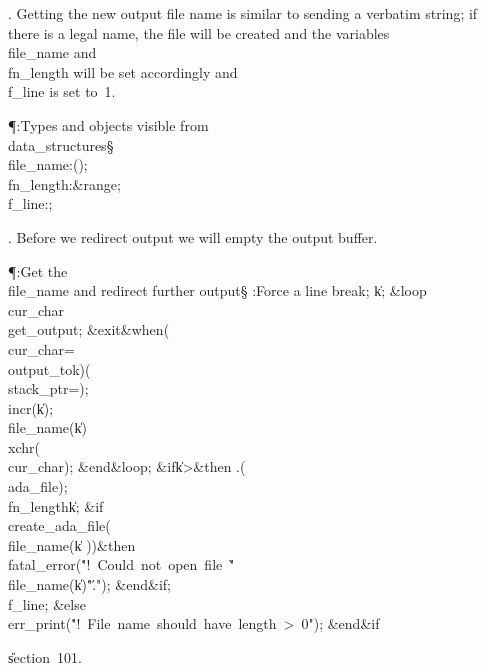 . Getting the new output file name is similar to sending a verbatim
string;
if there is a legal name, the file will be created and the variables
\\{file\_name} and \\{fn\_length} will be set accordingly and \\{f\_line} is
set
to~1.

\Y\P\?\4:Types and objects visible from \\{data\_structures}\X\mathrel{+}\S%
\?\6
\\{file\_name}\?:\?\?\1(\?\to{}\?\2)\?;\6
\\{fn\_length}\?:\?\8\&{range}\?\to{};\6
\\{f\_line}\?:\?;\par
\fi

. Before we redirect output we will empty the output buffer.

\Y\P\?\4:Get the \\{file\_name} and redirect further output\X\S\?\6
:Force a line break\X;\6
\|k\?\K{};\6
\1\&{loop}\6
\\{cur\_char}\?\K\?\\{get\_output};\5
\?\&{exit}\8\&{when}\8\1(\?\\{cur\_char}\?=\?\\{output\_tok}\?\2)\V\1(\?%
\\{stack\_ptr}\?=\?\2)\?;\6
\\{incr}\?\1(\?\|k\?\2)\?;\5
\\{file\_name}\?\1(\?\|k\?\2)\K\?\\{xchr}\?\1(\?\\{cur\_char}\?\2)\?;\2\6
\&{end}\8\&{loop};\6
\&{if}\1\1\8\|k\?>\2\8\&{then}\6
\?.\?\?\1(\?\\{ada\_file}\?\2)\?;\5
\\{fn\_length}\?\K\?\|k;\6
\&{if}\1\1\?\8\R\?\\{create\_ada\_file}\?\1(\?\\{file\_name}\?\1(\?\to\?\|k%
\?\2)\2)\?\2\8\&{then}\6
\\{fatal\_error}\?\1(\?\.{"!\ Could\ not\ open\ file\ \`"}\?\mathbin{\.\&}\?%
\\{file\_name}\?\1(\?\to\?\|k\?\2)\mathbin{\.\&}\?\.{"\'."}\?\2)\?;\2\6
\&{end}\8\2\&{if}\1;\6
\\{f\_line}\?\K{};\6
\4\&{else}\6
\\{err\_print}\?\1(\?\.{"!\ File\ name\ should\ have\ length\ >\ 0"}\?\2)\?;\2\6
\&{end}\8\2\&{if}\1\par
\U section~101.\fi

